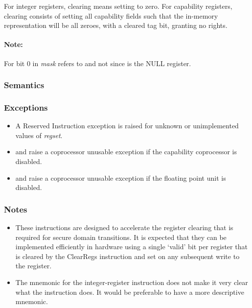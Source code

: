 For integer registers, clearing means setting to zero.
For capability registers, clearing consists of setting all
capability fields such that the in-memory representation will be all zeroes,
with a cleared tag bit, granting no rights.

\paragraph{Note:} For  bit 0 in \emph{mask} refers to \DDC{} and not  since  is the NULL register.

\subsubsection*{Semantics}


\subsubsection*{Exceptions}

\begin{itemize}
\item
A Reserved Instruction exception is raised for unknown or
unimplemented values of \emph{regset}.
\item
{} and  raise a coprocessor
unusable exception if the capability coprocessor is disabled.
\item
{} and  raise a coprocessor
unusable exception if the floating point unit is disabled.
\end{itemize}

\subsubsection*{Notes}

\begin{itemize}
\item
These instructions are designed to accelerate the register clearing
that is required for secure domain transitions.  It is expected that
they can be implemented efficiently in hardware using a single `valid'
bit per register that is cleared by the ClearRegs instruction and set
on any subsequent write to the register.
\item
The mnemonic for the integer-register instruction does not make it
very clear what the instruction does.
It would be preferable to have a more descriptive mnemonic.
\end{itemize}
